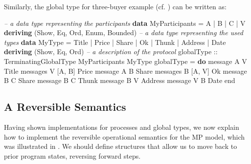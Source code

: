 \documentclass[runningheads,plain]{llncs}
\newenvironment{Shaded}{}{}
\newcommand{\KeywordTok}[1]{\textcolor[rgb]{0.00,0.44,0.13}{\textbf{#1}}}
\newcommand{\DataTypeTok}[1]{\textcolor[rgb]{0.56,0.13,0.00}{#1}}
\newcommand{\CommentTok}[1]{\textcolor[rgb]{0.38,0.63,0.69}{\textit{#1}}}
\newcommand{\OtherTok}[1]{\textcolor[rgb]{0.00,0.44,0.13}{#1}}
\newcommand{\FunctionTok}[1]{\textcolor[rgb]{0.02,0.16,0.49}{#1}}
\newcommand{\NormalTok}[1]{#1}
\begin{document}
\noindent
Similarly, the global type for three-buyer example (cf. ) can be written as:
\begin{Shaded}
\begin{Highlighting}[]
\CommentTok{-- a data type representing the participants}
\KeywordTok{data} \DataTypeTok{MyParticipants} \FunctionTok{=} \DataTypeTok{A} \FunctionTok{|} \DataTypeTok{B} \FunctionTok{|} \DataTypeTok{C} \FunctionTok{|} \DataTypeTok{V} 
    \KeywordTok{deriving}\NormalTok{ (}\DataTypeTok{Show}\NormalTok{, }\DataTypeTok{Eq}\NormalTok{, }\DataTypeTok{Ord}\NormalTok{, }\DataTypeTok{Enum}\NormalTok{, }\DataTypeTok{Bounded}\NormalTok{)}
\CommentTok{-- a data type representing the used types }
\KeywordTok{data} \DataTypeTok{MyType} \FunctionTok{=} \DataTypeTok{Title} \FunctionTok{|} \DataTypeTok{Price} \FunctionTok{|} \DataTypeTok{Share} \FunctionTok{|} \DataTypeTok{Ok} \FunctionTok{|} \DataTypeTok{Thunk} \FunctionTok{|} \DataTypeTok{Address} \FunctionTok{|} \DataTypeTok{Date}
    \KeywordTok{deriving}\NormalTok{ (}\DataTypeTok{Show}\NormalTok{, }\DataTypeTok{Eq}\NormalTok{, }\DataTypeTok{Ord}\NormalTok{)}
\CommentTok{-- a description of the protocol}
\OtherTok{globalType ::} \DataTypeTok{TerminatingGlobalType} \DataTypeTok{MyParticipants} \DataTypeTok{MyType}
\NormalTok{globalType }\FunctionTok{=} \KeywordTok{do} 
\NormalTok{    message }\DataTypeTok{A} \DataTypeTok{V} \DataTypeTok{Title} 
\NormalTok{    messages }\DataTypeTok{V}\NormalTok{ [}\DataTypeTok{A}\NormalTok{, }\DataTypeTok{B}\NormalTok{] }\DataTypeTok{Price} 
\NormalTok{    message }\DataTypeTok{A} \DataTypeTok{B} \DataTypeTok{Share} 
\NormalTok{    messages }\DataTypeTok{B}\NormalTok{ [}\DataTypeTok{A}\NormalTok{, }\DataTypeTok{V}\NormalTok{] }\DataTypeTok{Ok} 
\NormalTok{    message }\DataTypeTok{B} \DataTypeTok{C} \DataTypeTok{Share}
\NormalTok{    message }\DataTypeTok{B} \DataTypeTok{C} \DataTypeTok{Thunk}
\NormalTok{    message }\DataTypeTok{B} \DataTypeTok{V} \DataTypeTok{Address}
\NormalTok{    message }\DataTypeTok{V} \DataTypeTok{B} \DataTypeTok{Date}
\NormalTok{    end}
\end{Highlighting}
\end{Shaded}



\subsection{A Reversible Semantics}\label{a-reversible-semantics}
Having shown  implementations for processes and global types, we now explain how to implement the  reversible operational semantics
for the MP model, which was illustrated in .
We should define structures that allow us to move back to prior program states, reversing forward
steps.
\end{document}
